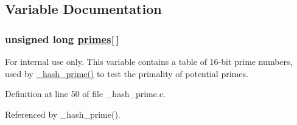 \subsection{Variable Documentation}
\hypertarget{group__dbprim__hash_ga0}{
\subsubsection[primes]{\setlength{\rightskip}{0pt plus 5cm}unsigned long \hyperlink{group__dbprim__hash_ga0}{primes}\mbox{[}$\,$\mbox{]}}}
\label{group__dbprim__hash_ga0}


\begin{Desc}
\item[For internal use only.]
This variable contains a table of 16-bit prime numbers, used by \hyperlink{group__dbprim__hash_ga19}{\_\-hash\_\-prime()} to test the primality of potential primes.\end{Desc}


Definition at line 50 of file \_\-hash\_\-prime.c.

Referenced by \_\-hash\_\-prime().